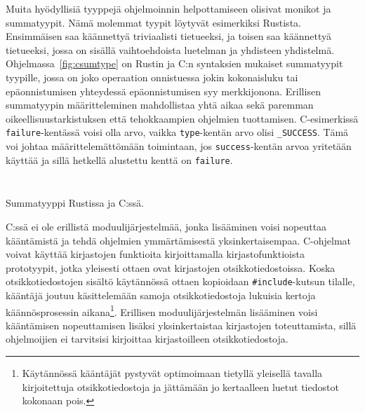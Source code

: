 Muita hyödyllisiä tyyppejä ohjelmoinnin helpottamiseen olisivat
monikot ja summatyypit. Nämä
molemmat tyypit löytyvät esimerkiksi Rustista. Ensimmäisen saa käännettyä
triviaalisti tietueeksi, ja toisen saa käännettyä tietueeksi, jossa on sisällä
vaihtoehdoista luetelman ja yhdisteen
yhdistelmä. Ohjelmassa~\ref{fig:csumtype} on Rustin ja C:n syntaksien mukaiset
summatyypit tyypille, jossa on joko operaation onnistuessa jokin kokonaisluku
tai epäonnistumisen yhteydessä epäonnistumisen syy merkkijonona. Erillisen
summatyypin määritteleminen mahdollistaa yhtä aikaa sekä paremman
oikeellisuustarkistuksen että tehokkaampien ohjelmien tuottamisen.
C-esimerkissä \texttt{failure}-kentässä voisi olla arvo, vaikka
\texttt{type}-kentän arvo olisi \texttt{\_SUCCESS}. Tämä voi johtaa
määrittelemättömään toimintaan, jos \texttt{success}-kentän arvoa yritetään
käyttää ja sillä hetkellä alustettu kenttä on \texttt{failure}.

\begin{listing}[ht!]
    \inputminted{Rust}{koodi/rustenum.rs}
    \inputminted[firstline=3]{C}{koodi/csumtype.c}
    \caption{Summatyyppi Rustissa ja C:ssä.}
    \label{fig:csumtype}
\end{listing}


C:ssä ei ole erillistä moduulijärjestelmää, jonka lisääminen voisi nopeuttaa
kääntämistä ja tehdä ohjelmien ymmärtämisestä yksinkertaisempaa. C-ohjelmat
voivat käyttää kirjastojen funktioita kirjoittamalla kirjastofunktioista
prototyypit, jotka yleisesti ottaen ovat kirjastojen otsikkotiedostoissa. Koska
otsikkotiedostojen sisältö käytännössä ottaen kopioidaan
\texttt{\#include}-kutsun tilalle, kääntäjä joutuu käsittelemään samoja
otsikkotiedostoja lukuisia kertoja käännösprosessin aikana\footnote{Käytännössä
kääntäjät pystyvät optimoimaan tietyllä yleisellä tavalla kirjoitettuja
otsikkotiedostoja ja jättämään jo kertaalleen luetut tiedostot kokonaan pois.}.
Erillisen moduulijärjestelmän lisääminen voisi kääntämisen nopeuttamisen
lisäksi yksinkertaistaa kirjastojen toteuttamista, sillä ohjelmoijien ei
tarvitsisi kirjoittaa kirjastoilleen otsikkotiedostoja. 

